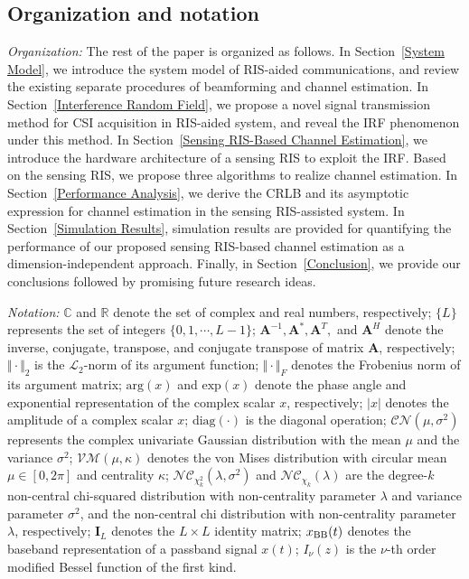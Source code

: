 \documentclass[journal,twocolumn]{IEEEtran}
\theoremstyle{nonumberplain}
\def \VM {\mathcal{VM}}
\def \nc {\mathcal{NC}}
\begin{document}
\subsection{Organization and notation}

\textit{Organization:}
The rest of the paper is organized as follows.
In Section~\ref{System Model}, we introduce the system model of RIS-aided communications, and review the existing separate procedures of beamforming and channel estimation.
In Section~\ref{Interference Random Field}, we propose a novel signal transmission method for CSI acquisition in RIS-aided system, and reveal the \ac{IRF} phenomenon under this method.
In Section~\ref{Sensing RIS-Based Channel Estimation}, we introduce the hardware architecture of a sensing RIS to exploit the \ac{IRF}.
Based on the sensing RIS, we propose three algorithms to realize channel estimation.
In Section~\ref{Performance Analysis}, we derive the \ac{CRLB} and its asymptotic expression for channel estimation in the sensing RIS-assisted system.
In Section~\ref{Simulation Results}, simulation results are provided for quantifying the performance of our proposed sensing RIS-based channel estimation as a dimension-independent approach.
Finally, in Section~\ref{Conclusion}, we provide our conclusions followed by promising future research ideas.

\textit{Notation:} $\mathbb C$ and $\mathbb R$ denote the set of complex and real numbers, respectively;
$\{L\}$ represents the set of integers $\{0,1,\cdots,L-1\}$;
$\bm A^{-1}, \bm A^*,\bm A^T,$ and $\bm A^H$ denote the inverse, conjugate, transpose, and conjugate transpose of matrix $\bm A$, respectively; 
$\Vert \cdot\Vert_{2}$ is the $\mathcal{L}_{2}$-norm of its argument function;
$\Vert \cdot \Vert_{F}$ denotes the Frobenius norm of its argument matrix;  
$\text{arg}(x)$ and $\text{exp}(x)$ denote the phase angle and exponential representation of the complex scalar $x$, respectively;
$\vert x\vert$ denotes the amplitude
of a complex scalar $x$; 
$\text{diag}(\cdot )$ is the diagonal operation;
$\mathcal{CN}\left(\mu, \sigma^2 \right)$ represents the complex univariate Gaussian distribution with the mean $\mu$ and the variance $\sigma^2$;
$\VM(\mu, \kappa)$ denotes the von Mises distribution with circular mean $\mu\in [0,2\pi]$ and centrality $\kappa$;
$\nc_{\chi_k^2}(\lambda, \sigma^2)$ and $\nc_{\chi_k}(\lambda)$ are the degree-$k$ non-central chi-squared distribution with  non-centrality parameter $\lambda$ and variance parameter $\sigma^2$, and the non-central chi distribution with non-centrality parameter $\lambda$, respectively; 
$\bm I_{L}$ denotes the $L\times L$ identity matrix;
$x_{\rm BB}(t)$ denotes the baseband representation of a passband signal $x(t)$;
$I_\nu(z)$ is the $\nu$-th order modified Bessel function of the first kind. 
\end{document}
